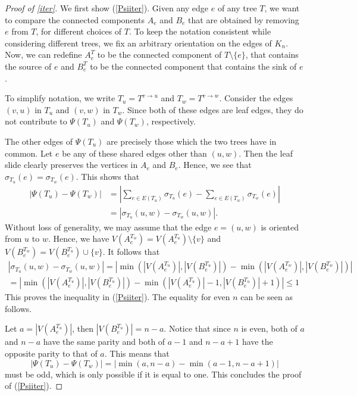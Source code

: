 \documentclass[reqno,dvipsnames]{amsart}
\theoremstyle{plain}
\numberwithin{equation}{section}
\theoremstyle{definition}
\begin{document}
\begin{proof}[Proof of \autoref{iter}]
	We first show (\ref{Psiiter}). Given any edge $e$ of any tree $T$, we want to compare the connected components $A_e$ and $B_e$ that are obtained by removing $e$ from $T$, for different choices of $T$. To keep the notation consistent while considering different trees, we fix an arbitrary orientation on the edges of $K_n$. Now, we can redefine $A_e^T$ to be the connected component of $T\setminus \{e\}$, that contains the source of $e$ and $B_e^T$ to be the connected component that contains the sink of $e$.

	To simplify notation, we write $T_u = T^{v\to u}$ and $T_w = T^{v\to w}$. Consider the edges $(v,u)$ in $T_u$ and $(v,w)$ in $T_w$. Since both of these edges are leaf edges, they do not contribute to $\Psi(T_u)$ and $\Psi(T_w)$, respectively.

	The other edges of $\Psi(T_u)$ are precisely those which the two trees have in common. Let $e$ be any of these shared edges other than $(u,w)$. Then the leaf slide clearly preserves the vertices in $A_e$ and $B_e$. Hence, we see that $\sigma_{T_u}(e) = \sigma_{T_w}(e)$. This shows that 
	\[
	\begin{split}
		|\Psi(T_u)-\Psi(T_w)| 	&= \left| \sum_{e\in E(T_u)}\sigma_{T_u}(e) - \sum_{e\in E(T_w)}\sigma_{T_w}(e)\right|\\
		&= |\sigma_{T_u}(u,w)-\sigma_{T_w}(u,w)|.
	\end{split}
	\]
	Without loss of generality, we may assume that the edge $e = (u,w)$ is oriented from $u$ to $w$. Hence,  we have $V(A_e^{T_w}) = V(A_e^{T_u})\setminus \{v\}$ and $V(B_e^{T_w}) = V(B_e^{T_u})\cup \{v\}$. It follows that 
	\[
	\begin{multlined}
		|\sigma_{T_u}(u,w)-\sigma_{T_w}(u,w)|  = \left|\min(|V(A_e^{T_u})|,|V(B_e^{T_u})|) - \min(|V(A_e^{T_w})|,|V(B_e^{T_w})|)\right|\\
		 = \left|\min(|V(A_e^{T_u})|,|V(B_e^{T_u})|) - \min(|V(A_e^{T_u})|-1,|V(B_e^{T_u})|+1)\right| \leq1
	\end{multlined}
	\]
	This proves the inequality in (\ref{Psiiter}). The equality for even $n$ can be seen as follows. 

	Let $a = |V(A_e^{T_u})|$, then $|V(B_e^{T_u})| = n-a$. Notice that since $n$ is even, both of $a$ and $n-a$ have the same parity and both of $a-1$ and $n-a+1$ have the opposite parity to that of $a$. This means that 
	\[
	|\Psi(T_u)-\Psi(T_w)| = |\min(a,n-a)-\min(a-1,n-a+1)|
	\]
	must be odd, which is only possible if it is equal to one. This concludes the proof of (\ref{Psiiter}).


\end{proof}
\end{document}
